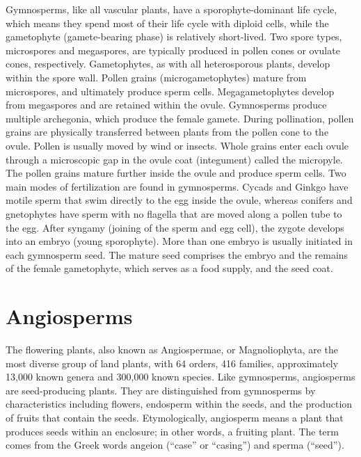 Gymnosperms, like all vascular plants, have a sporophyte-dominant life cycle, which means they spend most of their life cycle with diploid cells, while the gametophyte (gamete-bearing phase) is relatively short-lived. Two spore types, microspores and megaspores, are typically produced in pollen cones or ovulate cones, respectively. Gametophytes, as with all heterosporous plants, develop within the spore wall. Pollen grains (microgametophytes) mature from microspores, and ultimately produce sperm cells. Megagametophytes develop from megaspores and are retained within the ovule. Gymnosperms produce multiple archegonia, which produce the female gamete. During pollination, pollen grains are physically transferred between plants from the pollen cone to the ovule. Pollen is usually moved by wind or insects. Whole grains enter each ovule through a microscopic gap in the ovule coat (integument) called the micropyle. The pollen grains mature further inside the ovule and produce sperm cells. Two main modes of fertilization are found in gymnosperms. Cycads and Ginkgo have motile sperm that swim directly to the egg inside the ovule, whereas conifers and gnetophytes have sperm with no flagella that are moved along a pollen tube to the egg. After syngamy (joining of the sperm and egg cell), the zygote develops into an embryo (young sporophyte). More than one embryo is usually initiated in each gymnosperm seed. The mature seed comprises the embryo and the remains of the female gametophyte, which serves as a food supply, and the seed coat.

\hypertarget{angiosperms}{%
\section{Angiosperms}\label{angiosperms}}

The flowering plants, also known as Angiospermae, or Magnoliophyta, are the most diverse group of land plants, with 64 orders, 416 families, approximately 13,000 known genera and 300,000 known species. Like gymnosperms, angiosperms are seed-producing plants. They are distinguished from gymnosperms by characteristics including flowers, endosperm within the seeds, and the production of fruits that contain the seeds. Etymologically, angiosperm means a plant that produces seeds within an enclosure; in other words, a fruiting plant. The term comes from the Greek words angeion (``case'' or ``casing'') and sperma (``seed'').



